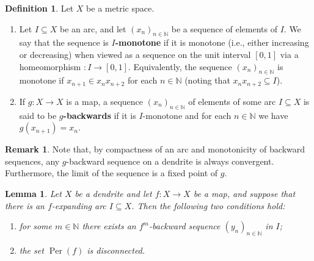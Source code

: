 \documentclass[12pt]{amsart}
\newtheorem{lemma}[theorem]{Lemma}
\theoremstyle{definition}
\newtheorem{definition}[theorem]{Definition}
\newtheorem{remark}[theorem]{Remark}
\numberwithin{equation}{section}
\DeclareMathOperator{\per}{Per}
\begin{document}
\begin{definition}
Let $X$ be a metric space.
\begin{enumerate}
\item Let $I\subseteq X$ be an arc, and let $(x_n)_{n\in\mathbb N}$ be a sequence of elements of $I$. We say 
         that the sequence is {\bf $I$-monotone} if it is monotone (i.e., either increasing or decreasing) when viewed 
         as a sequence on the unit interval $[0,1]$ via a homeomorphism $:I\longrightarrow[0,1]$. Equivalently, the 
         sequence $(x_n)_{n\in\mathbb N}$ is monotone if $x_{n+1}\in x_n x_{n+2}$ for each $n\in\mathbb N$ 
         (noting that $x_n x_{n+2}\subseteq I$).
\item If $g \colon X\longrightarrow X$ is a map, a sequence $(x_n)_{n\in\mathbb N}$ of elements of 
         some arc $I\subseteq X$ is said to be {\bf $g$-backwards} if it is $I$-monotone and for each $n \in \mathbb N$ 
         we have $g(x_{n+1})=x_n$.
\end{enumerate}
\end{definition}

\begin{remark}
Note that, by compactness of an arc and monotonicity of backward sequences, any $g$-backward sequence on a dendrite is always convergent. Furthermore, the limit of the sequence is a fixed point of $g$.
\end{remark}

\begin{lemma}\label{expandingtoadequate}
Let $X$ be a dendrite and let $f \colon X\longrightarrow X$ be a map, and suppose that there is an $f$-expanding arc $I\subseteq X$. Then the following two conditions hold:
\begin{enumerate}
\item[\emph{(1)}] for some $m\in\mathbb N$ there exists an $f^m$-backward sequence $(y_n)_{n\in\mathbb N}$ 
        in $I$;
\item[\emph{(2)}] the set $\per(f)$ is disconnected.
\end{enumerate}
\end{lemma}
\end{document}
